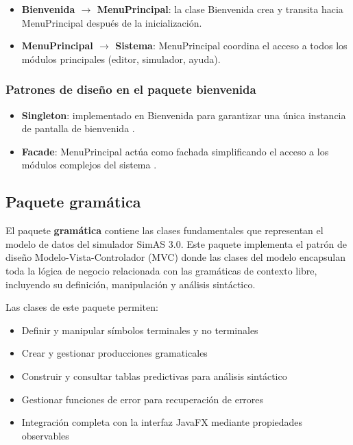 \begin{itemize}
    \item \textbf{Bienvenida $\rightarrow$ MenuPrincipal}: la clase Bienvenida crea y transita hacia MenuPrincipal después de la inicialización.
    \item \textbf{MenuPrincipal $\rightarrow$ Sistema}: MenuPrincipal coordina el acceso a todos los módulos principales (editor, simulador, ayuda).
\end{itemize}

\subsubsection{Patrones de diseño en el paquete bienvenida}

\begin{itemize}
    \item \textbf{Singleton}: implementado en Bienvenida para garantizar una única instancia de pantalla de bienvenida \cite{gamma1995design}.
    \item \textbf{Facade}: MenuPrincipal actúa como fachada simplificando el acceso a los módulos complejos del sistema \cite{gamma1995design}.
\end{itemize}

\subsection{Paquete gramática}

El paquete \textbf{gramática} contiene las clases fundamentales que representan el modelo de datos del simulador SimAS 3.0. Este paquete implementa el patrón de diseño Modelo-Vista-Controlador (MVC) donde las clases del modelo encapsulan toda la lógica de negocio relacionada con las gramáticas de contexto libre, incluyendo su definición, manipulación y análisis sintáctico.

Las clases de este paquete permiten:
\begin{itemize}
    \item Definir y manipular símbolos terminales y no terminales
    \item Crear y gestionar producciones gramaticales
    \item Construir y consultar tablas predictivas para análisis sintáctico
    \item Gestionar funciones de error para recuperación de errores
    \item Integración completa con la interfaz JavaFX mediante propiedades observables
\end{itemize}

